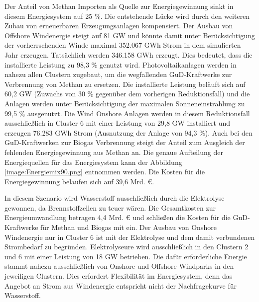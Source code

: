 Der Anteil von Methan Importen als Quelle zur Energiegewinnung sinkt in diesem Energiesystem auf 25 \%. Die entstehende Lücke wird durch den weiteren Zubau von erneuerbaren Erzeugungsanlagen kompensiert. Der Ausbau von Offshore Windenergie steigt auf 81 GW und könnte damit unter Berücksichtigung der vorherrschenden Winde maximal 352.067 GWh Strom in dem simulierten Jahr erzeugen. Tatsächlich werden 346.158 GWh erzeugt. Dies bedeutet, dass die installierte Leistung zu 98,3 \% genutzt wird.
Photovoltaikanlagen werden in nahezu allen Clustern zugebaut, um die wegfallenden GuD-Kraftwerke zur Verbrennung von Methan zu ersetzen. Die installierte Leistung beläuft sich auf 60,2 GW (Zuwachs von 30 \% gegenüber dem vorherigen Reduktionsfall) und die Anlagen werden unter Berücksichtigung der maximalen Sonneneinstrahlung zu 99,5 \% ausgenutzt.
Die Wind Onshore Anlagen werden in diesem Reduktionsfall ausschließlich in Cluster 6 mit einer Leistung von 29,8 GW installiert und erzeugen 76.283 GWh Strom (Ausnutzung der Anlage von 94,3 \%). Auch bei den GuD-Kraftwerken zur Biogas Verbrennung steigt der Anteil zum Ausgleich der fehlenden Energiegewinnung aus Methan an. 
Die genaue Aufteilung der Energiequellen für das Energiesystem kann der Abbildung \ref{image:Energiemix90.png} entnommen werden.
Die Kosten für die Energiegewinnung belaufen sich auf 39,6 Mrd. €.


In diesem Szenario wird Wasserstoff ausschließlich durch die Elektrolyse gewonnen, da Brennstoffzellen zu teuer wären.
Die Gesamtkosten zur Energieumwandlung betragen 4,4 Mrd. € und schließen die Kosten für die GuD-Kraftwerke für Methan und Biogas mit ein.
Der Ausbau von Onshore Windenergie nur in Cluster 6 ist mit der Elektrolyse und dem damit verbundenen Strombedarf zu begründen. 
Elektrolyseure wird ausschließlich in den Clustern 2 und 6 mit einer Leistung von 18 GW betrieben. Die dafür erforderliche Energie stammt nahezu ausschließlich von Onshore und Offshore Windparks in den jeweiligen Clustern. Dies erfordert Flexibilität im Energiesystem, denn das Angebot an Strom aus Windenergie entspricht nicht der Nachfragekurve für Wasserstoff. 

